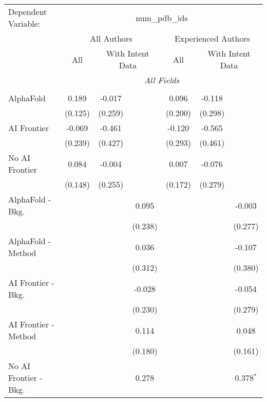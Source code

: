 \begingroup
\centering
\begin{tabular}{lcccccc}
   \tabularnewline \midrule \midrule
   Dependent Variable: & \multicolumn{6}{c}{num\_pdb\_ids}\\
 & \multicolumn{3}{c}{All Authors} & \multicolumn{3}{c}{Experienced Authors} \\
\cmidrule(lr){2-4} \cmidrule(lr){5-7}
 & \multicolumn{1}{c}{All} & \multicolumn{2}{c}{With Intent Data} & \multicolumn{1}{c}{All} & \multicolumn{2}{c}{With Intent Data} \\
\cmidrule(lr){2-2} \cmidrule(lr){3-4} \cmidrule(lr){5-5} \cmidrule(lr){6-7}
 & \multicolumn{6}{c}{\textit{All Fields}} \\ \\
   AlphaFold               & 0.189   & -0.017  &         & 0.096   & -0.118  &   \\   
                           & (0.125) & (0.259) &         & (0.200) & (0.298) &   \\   
   AI Frontier             & -0.069  & -0.461  &         & -0.120  & -0.565  &   \\   
                           & (0.239) & (0.427) &         & (0.293) & (0.461) &   \\   
   No AI Frontier          & 0.084   & -0.004  &         & 0.007   & -0.076  &   \\   
                           & (0.148) & (0.255) &         & (0.172) & (0.279) &   \\   
   AlphaFold - Bkg.        &         &         & 0.095   &         &         & -0.003\\   
                           &         &         & (0.238) &         &         & (0.277)\\   
   AlphaFold - Method      &         &         & 0.036   &         &         & -0.107\\   
                           &         &         & (0.312) &         &         & (0.380)\\   
   AI Frontier - Bkg.      &         &         & -0.028  &         &         & -0.054\\   
                           &         &         & (0.230) &         &         & (0.279)\\   
   AI Frontier - Method    &         &         & 0.114   &         &         & 0.048\\   
                           &         &         & (0.180) &         &         & (0.161)\\   
   No AI Frontier - Bkg.   &         &         & 0.278   &         &         & 0.378$^{*}$\\   

\end{tabular}
